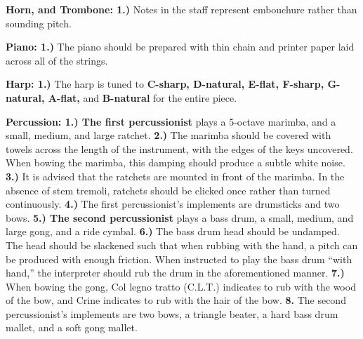 \documentclass[11pt]{article}
\begin{document}
\begingroup
\begin{center}
\textbf{Horn, and Trombone: 1.)} Notes in the staff represent embouchure rather than sounding pitch. \\
\rightskip\leftskip
\end{center}
\endgroup

\begingroup
\begin{center}
\textbf{Piano: 1.)} The piano should be prepared with thin chain and printer paper laid across all of the strings. \\
\rightskip\leftskip
\end{center}
\endgroup

\begingroup
\begin{center}
\textbf{Harp: 1.)} The harp is tuned to \textbf{C-sharp, D-natural, E-flat, F-sharp, G-natural, A-flat,} and \textbf{B-natural} for the entire piece. \\
\rightskip\leftskip
\end{center}
\endgroup

\begingroup
\begin{center}
\textbf{Percussion: 1.) The first percussionist} plays a 5-octave marimba, and a small, medium, and large ratchet. \textbf{2.)} The marimba should be covered with towels across the length of the instrument, with the edges of the keys uncovered. When bowing the marimba, this damping should produce a subtle white noise. \textbf{3.)}  It is advised that the ratchets are mounted in front of the marimba. In the absence of stem tremoli, ratchets should be clicked once rather than turned continuously. \textbf{4.)} The first percussionist's implements are drumsticks and two bows. \textbf{5.) The second percussionist} plays a bass drum, a small, medium, and large gong, and a ride cymbal. \textbf{6.)} The bass drum head should be undamped. The head should be slackened such that when rubbing with the hand, a pitch can be produced with enough friction. When instructed to play the bass drum ``with hand,'' the interpreter should rub the drum in the aforementioned manner. \textbf{7.)} When bowing the gong, Col legno tratto (C.L.T.) indicates to rub with the wood of the bow, and Crine indicates to rub with the hair of the bow. \textbf{8.} The second percussionist's implements are two bows, a triangle beater, a hard bass drum mallet, and a soft gong mallet. \\
\rightskip\leftskip
\end{center}
\endgroup
\end{document}
